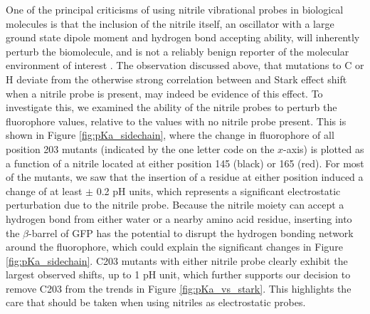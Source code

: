 One of the principal criticisms of using nitrile vibrational probes in biological molecules is that the inclusion of the nitrile itself, an oscillator with a large ground state dipole moment and hydrogen bond accepting ability, will inherently perturb the biomolecule, and is not a reliably benign reporter of the molecular environment of interest \cite{Adhikary2014}.
The observation discussed above, that mutations to C or H deviate from the otherwise strong correlation between \pKa{} and Stark effect shift when a nitrile probe is present, may indeed be evidence of this effect.
To investigate this, we examined the ability of the nitrile probes to perturb the fluorophore \pKa{} values, relative to the values with no nitrile probe present.
This is shown in Figure \ref{fig:pKa_sidechain}, where the change in fluorophore \pKa{} of all position 203 mutants (indicated by the one letter code on the $x$-axis) is plotted as a function of a nitrile located at either position 145 (black) or 165 (red).
For most of the mutants, we saw that the insertion of a \pCNF{} residue at either position induced a \pKa{} change of at least $\pm$ 0.2 pH units, which represents a significant electrostatic perturbation due to the nitrile probe.
Because the nitrile moiety can accept a hydrogen bond from either water or a nearby amino acid residue, inserting \pCNF{} into the $\beta$-barrel of GFP has the potential to disrupt the hydrogen bonding network around the fluorophore, which could explain the significant \pKa{} changes in Figure \ref{fig:pKa_sidechain}.
C203 mutants with either nitrile probe clearly exhibit the largest observed \pKa{} shifts, up to 1 pH unit, which further supports our decision to remove C203 from the trends in Figure \ref{fig:pKa_vs_stark}.
This highlights the care that should be taken when using nitriles as electrostatic probes.

